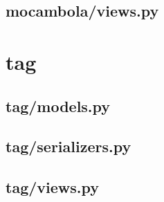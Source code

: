 \subsection{mocambola/views.py}




\section{tag}

\subsection{tag/models.py}


\subsection{tag/serializers.py}


\subsection{tag/views.py}


%

%


